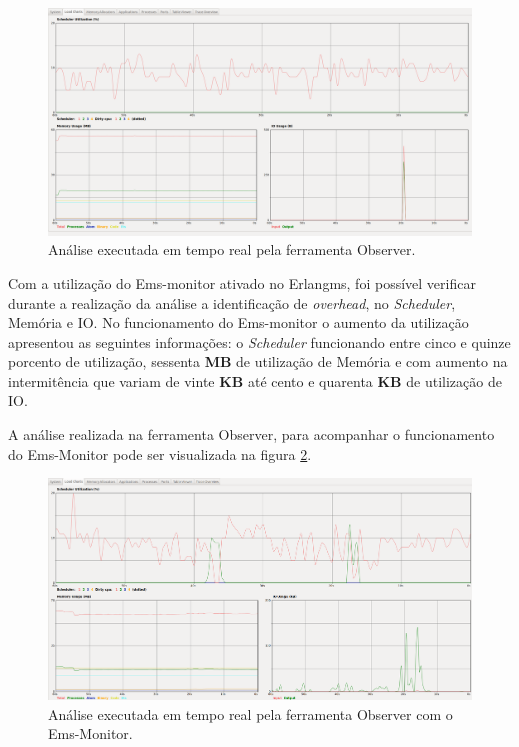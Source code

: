 \begin{figure}[H]
    \centering
    \includegraphics[scale = 0.33]{img/Observer_ErlangMS_sem_SNMP.png}
    \caption{Análise executada em tempo real pela ferramenta Observer.}
    \label{fun:fig:Observer_ErlangMS_sem_SNMP}
\end{figure}

Com a utilização do Ems-monitor ativado no Erlangms, foi possível verificar durante a realização da análise a identificação de \textit{overhead}, no \textit{Scheduler}, Memória e IO. No funcionamento do Ems-monitor o aumento da utilização apresentou as seguintes informações:  o \textit{Scheduler} funcionando entre cinco e quinze porcento de utilização, sessenta \textbf{MB} de utilização de Memória e com aumento na intermitência que variam de vinte \textbf{KB} até cento e quarenta \textbf{KB} de utilização de IO. 

A análise realizada na ferramenta Observer, para acompanhar o funcionamento do Ems-Monitor pode ser visualizada na figura \ref{fun:fig:Observer_ErlangMS_com_SNMP}.  

\begin{figure}[H]
    \centering
    \includegraphics[scale = 0.33]{img/Observer_ErlangMS_com_SNMP.png}
    \caption{Análise executada em tempo real pela ferramenta Observer com o Ems-Monitor.}
    \label{fun:fig:Observer_ErlangMS_com_SNMP}
\end{figure}

